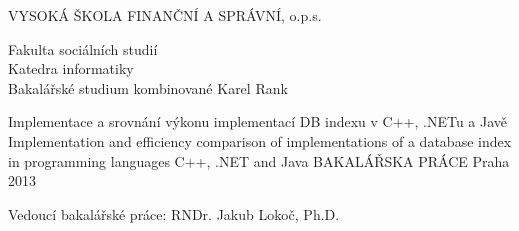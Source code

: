 \begin{titlepage}
\begin{center}
{\Large VYSOKÁ ŠKOLA FINANČNÍ A SPRÁVNÍ, o.p.s.}

{\large Fakulta sociálních studií\\
Katedra informatiky\\
Bakalářské studium kombinované}
\vfill
{\Large Karel Rank\\[1in]}

{\large Implementace a srovnání výkonu implementací DB indexu v C++, .NETu a Javě\\
Implementation and efficiency comparison of implementations of a database index in programming languages C++, .NET and Java}
\vfill
{\Large BAKALÁŘSKA PRÁCE}
\vfill
{\large Praha 2013}

\end{center}
{\large Vedoucí bakalářské práce: RNDr. Jakub Lokoč, Ph.D.}
\end{titlepage}